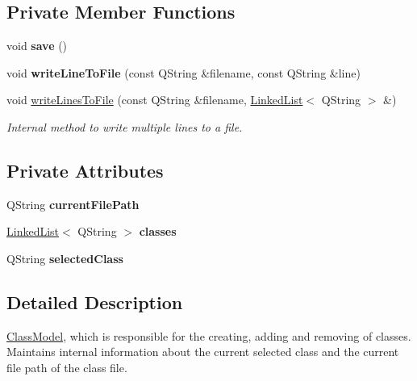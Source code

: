 \subsection*{Private Member Functions}
\begin{DoxyCompactItemize}
\item 
\mbox{\label{classClassModel_ab229a1a8dacc1a892d3757965d6f1e3a}} 
void {\bfseries save} ()
\item 
\mbox{\label{classClassModel_a4ef5baaf966305d2ebb44bf2c40ee533}} 
void {\bfseries write\+Line\+To\+File} (const Q\+String \&filename, const Q\+String \&line)
\item 
void \hyperlink{classClassModel_af443615d1dcb44d5345f1411e9822b25}{write\+Lines\+To\+File} (const Q\+String \&filename, \hyperlink{classLinkedList}{Linked\+List}$<$ Q\+String $>$ \&)
\begin{DoxyCompactList}\small\item\em Internal method to write multiple lines to a file. \end{DoxyCompactList}\end{DoxyCompactItemize}
\subsection*{Private Attributes}
\begin{DoxyCompactItemize}
\item 
\mbox{\label{classClassModel_a0fbc77cdbd9d9bc73720a83e21b36bc5}} 
Q\+String {\bfseries current\+File\+Path}
\item 
\mbox{\label{classClassModel_ace0d48f097f2dd9423f6d0a8963f285d}} 
\hyperlink{classLinkedList}{Linked\+List}$<$ Q\+String $>$ {\bfseries classes}
\item 
\mbox{\label{classClassModel_a889068a566bcefe28ef73c92aa40ce7c}} 
Q\+String {\bfseries selected\+Class}
\end{DoxyCompactItemize}


\subsection{Detailed Description}
\hyperlink{classClassModel}{Class\+Model}, which is responsible for the creating, adding and removing of classes. Maintains internal information about the current selected class and the current file path of the class file. 

